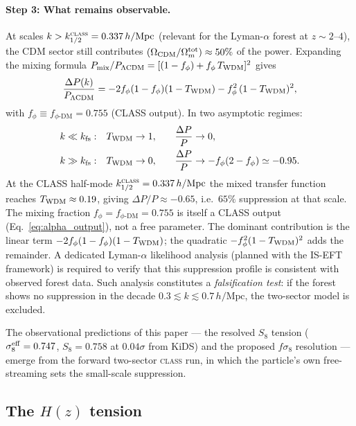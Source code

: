 \documentclass[12pt,a4paper]{article}
\newcommand{\phiDM}{\phi\text{-DM}}
\newcommand{\fphi}{f_\phi}
\newcommand{\kfs}{k_{\rm fs}}
\newcommand{\fsig}{f\sigma_8}
\newcommand{\sigeff}{\sigma_8^{\rm eff}}
\begin{document}
\paragraph{Step 3: What remains observable.}
At scales $k > k_{1/2}^{\textsc{class}} = 0.337\,h/\mathrm{Mpc}$ (relevant for the
Lyman-$\alpha$ forest at $z \sim 2$--$4$), the CDM sector still contributes
$(\Omega_{\rm CDM}/\Omega_m^{\rm tot}) \approx 50\%$ of the power.  Expanding
the mixing formula $P_{\rm mix}/P_{\rm \Lambda CDM} = [(1-\fphi) + \fphi\,T_{\rm WDM}]^2$
gives
\begin{equation}
  \frac{\Delta P(k)}{P_{\Lambda\mathrm{CDM}}} =
  -2\fphi(1-\fphi)(1-T_{\rm WDM})
  - \fphi^2\,(1-T_{\rm WDM})^2,
  \label{eq:power_suppression}
\end{equation}
with $\fphi \equiv f_{\phiDM} = 0.755$ (CLASS output).  In two asymptotic regimes:
\begin{alignat}{2}
  k \ll \kfs:& \quad T_{\rm WDM}\to 1,\quad
    &\frac{\Delta P}{P} &\to 0, \\
  k \gg \kfs:& \quad T_{\rm WDM}\to 0,\quad
    &\frac{\Delta P}{P} &\to -\fphi(2-\fphi) \simeq -0.95.
    \label{eq:suppression_asymp}
\end{alignat}
At the CLASS half-mode $k_{1/2}^{\textsc{class}} = 0.337\,h/\mathrm{Mpc}$ the
mixed transfer function reaches $T_{\rm WDM}\approx 0.19$, giving
$\Delta P/P \approx -0.65$, i.e.\ $65\%$ suppression at that scale.
The mixing fraction $\fphi = f_{\phiDM} = 0.755$ is itself a CLASS output
(Eq.~\ref{eq:alpha_output}), not a free parameter.
The dominant contribution is the linear term $-2\fphi(1-\fphi)(1-T_{\rm WDM})$;
the quadratic $-\fphi^2(1-T_{\rm WDM})^2$ adds the remainder.
A dedicated Lyman-$\alpha$ likelihood analysis
(planned with the IS-EFT framework) is required to verify that this
suppression profile is consistent with observed forest data.  Such analysis
constitutes a \emph{falsification test}: if the forest shows no suppression
in the decade $0.3 \lesssim k \lesssim 0.7\,h/\mathrm{Mpc}$, the two-sector
model is excluded.

The observational predictions of this paper — the resolved $S_8$ tension
($\sigeff = 0.747$, $S_8 = 0.758$ at $0.04\sigma$ from KiDS) and the proposed
$\fsig$ resolution — emerge from the forward two-sector \textsc{class} run, in
which the particle's own free-streaming sets the small-scale suppression.

\subsection{The $H(z)$ tension}
\label{subsec:Hz}
\end{document}
